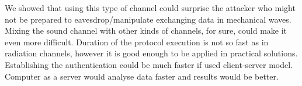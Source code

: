 \documentclass[11pt,titlepage]{article}
\theoremstyle{plain}
\begin{document}
\vspace{5mm}

We showed that using this type of channel could surprise the attacker who might not be prepared to eavesdrop/manipulate exchanging data in mechanical waves. Mixing the sound channel with other kinds of channels, for sure, could make it even more difficult. Duration of the protocol execution is not so fast as in radiation channels, however it is good enough to be applied in practical solutions. Establishing the authentication could be much faster if used client-server model. Computer as a server would analyse data faster and results would be better.







\end{document}
